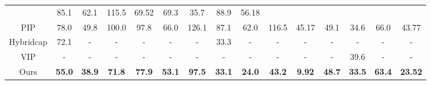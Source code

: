\begin{table*}[t]
{\begin{tabular}{c|ccc|ccc|cccc|cccc}
                                             & \multicolumn{1}{c}{85.1}      & \multicolumn{1}{c}{62.1}     & \multicolumn{1}{c}{115.5}         &69.52                     & \multicolumn{1}{c}{69.3}      & \multicolumn{1}{c}{35.7}            & \multicolumn{1}{c}{88.9}   &56.18   \\ 
PIP                                          & \multicolumn{1}{c}{78.0}       & \multicolumn{1}{c}{49.8}    & \multicolumn{1}{c|}{100.0}  & \multicolumn{1}{c}{97.8}       & \multicolumn{1}{c}{66.0}          & \multicolumn{1}{c|}{126.1}    
                                             & \multicolumn{1}{c}{87.1}      & \multicolumn{1}{c}{62.0}     & \multicolumn{1}{c}{116.5}         &45.17                     & \multicolumn{1}{c}{49.1}      & \multicolumn{1}{c}{34.6}            & \multicolumn{1}{c}{66.0}   &43.77   \\
Hybridcap                                    & \multicolumn{1}{c}{72.1}       & \multicolumn{1}{c}{-}       & \multicolumn{1}{c|}{-}      & \multicolumn{1}{c}{-}          & \multicolumn{1}{c}{-}             & \multicolumn{1}{c|}{-}    
                                             & \multicolumn{1}{c}{33.3}  & \multicolumn{1}{c}{-}         & \multicolumn{1}{c}{-}    & -                   & \multicolumn{1}{c}{-}         & \multicolumn{1}{c}{-}               & \multicolumn{1}{c}{-}      & -\\
VIP                                          & \multicolumn{1}{c}{-}       & \multicolumn{1}{c}{-}       & \multicolumn{1}{c|}{-}      & \multicolumn{1}{c}{-}          & \multicolumn{1}{c}{-}             & \multicolumn{1}{c|}{-}    
                                             & \multicolumn{1}{c}{-}  & \multicolumn{1}{c}{-}         & \multicolumn{1}{c}{-}    & -                   & \multicolumn{1}{c}{-}         & \multicolumn{1}{c}{39.6}               & \multicolumn{1}{c}{-}      & -\\ 
Ours                             & \multicolumn{1}{c}{\textbf{55.0}}& \multicolumn{1}{c}{\textbf{38.9}}& \multicolumn{1}{c|}{\textbf{71.8}} & \multicolumn{1}{c}{\textbf{77.9}}& \multicolumn{1}{c}{\textbf{53.1}}& \multicolumn{1}{c|}{\textbf{97.5}}         
                    & \multicolumn{1}{c}{\textbf{33.1}}& \multicolumn{1}{c}{\textbf{24.0}}& \multicolumn{1}{c}{\textbf{43.2}}   & \textbf{9.92}       & \multicolumn{1}{c}{\textbf{48.7}}& \multicolumn{1}{c}{\textbf{33.5}} & \multicolumn{1}{c}{\textbf{63.4}}     & \textbf{23.52} \\
\hline
\end{tabular}}
\end{table*}
%
